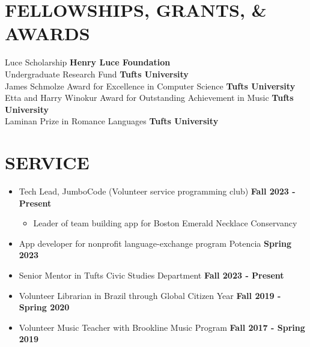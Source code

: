 \documentclass[12pt]{article}
\begin{document}
\vspace{-\baselineskip}




\section*{FELLOWSHIPS, GRANTS, \& AWARDS}
Luce Scholarship                                                      \hfill \textbf{Henry Luce Foundation} \\
Undergraduate Research Fund \hfill                                    \textbf{Tufts University} \\
James Schmolze Award for Excellence in Computer Science               \hfill \textbf{Tufts University} \\
Etta and Harry Winokur Award for Outstanding Achievement in Music     \hfill \textbf{Tufts University} \\
Laminan Prize in Romance Languages                                    \hfill \textbf{Tufts University} \\


\section*{SERVICE}
\vspace{-0.5\baselineskip}
\begin{itemize}
    \itemsep=-0.3em
    \item Tech Lead, JumboCode (Volunteer service programming club) \hfill \textbf{Fall 2023 - Present}
    \begin{itemize}
        \item Leader of team building app for Boston Emerald Necklace Conservancy 
    \end{itemize}
    \item App developer for nonprofit language-exchange program Potencia \hfill \textbf{Spring 2023}
    \item Senior Mentor in Tufts Civic Studies Department  \hfill \textbf{Fall 2023 - Present}
    \item Volunteer Librarian in Brazil through Global Citizen Year \hfill \textbf{Fall 2019 - Spring 2020}
    \item Volunteer Music Teacher with Brookline Music Program \hfill \textbf{Fall 2017 - Spring 2019}
\end{itemize}
\end{document}
